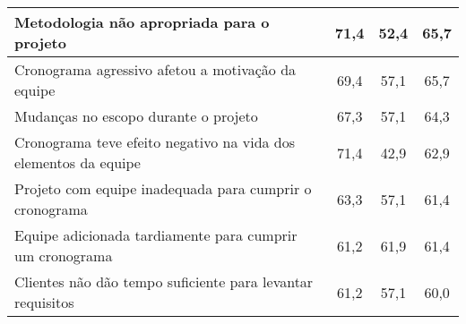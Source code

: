 \begin{table}[ht]
\begin{tabular}{lccc}
Metodologia não apropriada para o projeto & 71,4 & 52,4 & 65,7\tabularnewline

\hline

Cronograma agressivo afetou a motivação da equipe & 69,4 & 57,1 & 65,7\tabularnewline

\hline

Mudanças no escopo durante o projeto & 67,3 & 57,1 & 64,3\tabularnewline

\hline

Cronograma teve efeito negativo na vida dos elementos da equipe & 71,4 & 42,9 & 62,9\tabularnewline

\hline

Projeto com equipe inadequada para cumprir o cronograma & 63,3 & 57,1 & 61,4\tabularnewline

\hline

Equipe adicionada tardiamente para cumprir um cronograma & 61,2 & 61,9 & 61,4\tabularnewline

\hline

Clientes não dão tempo suficiente para levantar requisitos & 61,2 & 57,1 & 60,0\tabularnewline

\hline

\end{tabular}
\end{table}